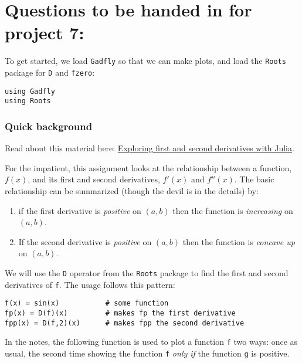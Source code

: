 \documentclass[12pt]{article}
\begin{document}
\section{Questions to be handed in for project 7:}

To get started, we load \texttt{Gadfly} so that we can make plots, and
load the \texttt{Roots} package for \texttt{D} and \texttt{fzero}:



\begin{verbatim}
using Gadfly            
using Roots         
\end{verbatim}
\subsubsection{Quick background}

Read about this material here:
\href{http://mth229.github.io/first-second-derivatives.html}{Exploring
first and second derivatives with Julia}.

For the impatient, this assignment looks at the relationship between a
function, $f(x)$, and its first and second derivatives, $f'(x)$ and
$f''(x)$. The basic relationship can be summarized (though the devil is
in the details) by:

\begin{enumerate}
\def\labelenumi{\arabic{enumi})}
\item
  if the first derivative is \emph{positive} on $(a,b)$ then the
  function is \emph{increasing} on $(a,b)$.
\item
  If the second derivative is \emph{positive} on $(a,b)$ then the
  function is \emph{concave up} on $(a,b)$.
\end{enumerate}

We will use the \texttt{D} operator from the \texttt{Roots} package to
find the first and second derivatives of \texttt{f}. The usage follows
this pattern:



\begin{verbatim}
f(x) = sin(x)           # some function
fp(x) = D(f)(x)         # makes fp the first derivative
fpp(x) = D(f,2)(x)      # makes fpp the second derivative
\end{verbatim}
In the notes, the following function is used to plot a function
\texttt{f} two ways: once as usual, the second time showing the function
\texttt{f} \emph{only if} the function \texttt{g} is positive.
\end{document}
